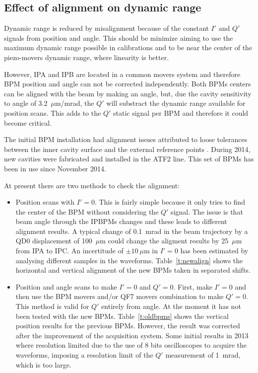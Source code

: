 \subsection{Effect of alignment on dynamic range}
Dynamic range is reduced by misalignment because of the constant $I'$ and $Q'$ signals from position and angle. This should be minimize aiming to use the maximum dynamic range possible in calibrations and to be near the center of the piezo-movers dynamic range, where linearity is better.\par
However, IPA and IPB are located in a common movers system and therefore BPM position and angle can not be corrected independently. Both BPMs centers can be aligned with the beam by making an angle, but, due the cavity sensitivity to angle of 3.2~$\mu$m/mrad, the $Q'$ will substract the dynamic range available for position scans. This adds to the $Q'$ static signal per BPM and therefore it could become critical.\par
The initial BPM installation \cite{Bambade2013} had alignment issues attributed to loose tolerances between the inner cavity surface and the external reference points \cite{Siwon2014}. During 2014, new cavities were fabricated and installed in the ATF2 line. This set of BPMs has been in use since November 2014.\par
At present there are two methods to check the alignment:
\begin{itemize}
 \item Position scans with $I'=0$. This is fairly simple because it only tries to find the center of the BPM without considering the $Q'$ signal. The issue is that beam angle through the IPBPMs changes and these leads to different alignment results. A typical change of 0.1~mrad in the beam trajectory by a QD0 displacement of 100~$\mu$m could change the aligment results by 25~$\mu$m from IPA to IPC. An incertitude of $\pm10~\mu$m in $I'=0$ has been estimated by analysing different samples in the waveforms. Table~\ref{t:newalign} shows the horizontal and vertical alignment of the new BPMs taken in separated shifts.\par
 \item Position and angle scans to make $I'=0$ and $Q'=0$. First, make $I'=0$ and then use the BPM movers and/or QF7 movers combination to make $Q'=0$. This method is valid for $Q'$ entirely from angle. At the moment it has not been tested with the new BPMs. Table~\ref{t:oldbpms} shows the vertical position results for the previous BPMs. However, the result was corrected after the improvement of the acquisition system. Some initial results in 2013 where resolution limited due to the use of 8 bits oscilloscopes to acquire the waveforms, imposing a resolution limit of the $Q'$ measurement of 1~mrad, which is too large.\par
\end{itemize}
